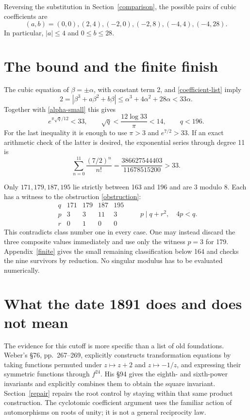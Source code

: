 \documentclass[11pt]{article}
\begin{document}
Reversing the substitution in Section~\ref{comparison}, the possible
pairs of cubic coefficients are
\begin{equation}\label{coefficient-list}
 (a,b)=(0,0),(2,4),(-2,0),(-2,8),(-4,4),(-4,28).
\end{equation}
In particular, \(|a|\le4\) and \(0\le b\le28\).

\section{The bound and the finite finish}\label{finish}

The cubic equation of \(\beta=\pm\alpha\), with constant term 2,
and \eqref{coefficient-list} imply
\[
 2=|\beta^3+a\beta^2+b\beta|
 \le\alpha^3+4\alpha^2+28\alpha<33\alpha.
\]
Together with \eqref{alpha-small} this gives
\[
 e^{\pi\sqrt q/12}<33,
 \qquad \sqrt q<\frac{12\log33}{\pi}<14,
 \qquad q<196.
\]
For the last inequality it is enough to use \(\pi>3\) and
\(e^{7/2}>33\). If an exact arithmetic check of the latter is desired,
the exponential series through degree 11 is
\[
 \sum_{n=0}^{11}\frac{(7/2)^n}{n!}
       =\frac{386627544403}{11678515200}>33.
\]

Only \(171,179,187,195\) lie strictly between 163 and 196 and are
3 modulo 8. Each has a witness to the obstruction
\eqref{obstruction}:
\[
\begin{array}{c|rrrr}
 q&171&179&187&195\\ \hline
 p&3&3&11&3\\
 r&0&1&0&0
\end{array}
\qquad p\mid q+r^2,\quad 4p<q.
\]
This contradicts class number one in every case. One may instead
discard the three composite values immediately and use only the
witness \(p=3\) for 179. Appendix~\ref{finite} gives the small
remaining classification below 164 and checks the nine survivors by
reduction. No singular modulus has to be evaluated numerically.

\section{What the date 1891 does and does not mean}\label{assessment}

The evidence for this cutoff is more specific than a list of old
foundations. Weber's \S76, pp.~267--269, explicitly constructs
transformation equations by taking functions permuted under
\(z\mapsto z+2\) and \(z\mapsto-1/z\), and expressing their
symmetric functions through \(f^{24}\). His \S94 gives the
eighth- and sixth-power invariants and explicitly combines them to
obtain the square invariant. Section~\ref{repair} repairs the root
control by staying within that same product construction. The
cyclotomic coefficient argument uses the familiar action of
automorphisms on roots of unity; it is not a general reciprocity law.
\end{document}
